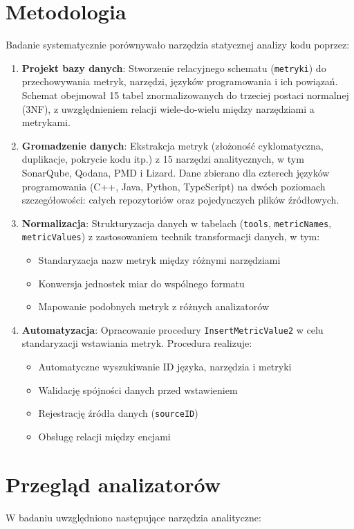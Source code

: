 \documentclass[a4paper,12pt]{article}
\begin{document}
\section{Metodologia}
Badanie systematycznie porównywało narzędzia statycznej analizy kodu poprzez:

\begin{enumerate}
\item \textbf{Projekt bazy danych}: Stworzenie relacyjnego schematu (\texttt{metryki}) do przechowywania metryk, narzędzi, języków programowania i ich powiązań. Schemat obejmował 15 tabel znormalizowanych do trzeciej postaci normalnej (3NF), z uwzględnieniem relacji wiele-do-wielu między narzędziami a metrykami.

\item \textbf{Gromadzenie danych}: Ekstrakcja metryk (złożoność cyklomatyczna, duplikacje, pokrycie kodu itp.) z 15 narzędzi analitycznych, w tym SonarQube, Qodana, PMD i Lizard. Dane zbierano dla czterech języków programowania (C++, Java, Python, TypeScript) na dwóch poziomach szczegółowości: całych repozytoriów oraz pojedynczych plików źródłowych.

\item \textbf{Normalizacja}: Strukturyzacja danych w tabelach (\texttt{tools}, \texttt{metricNames}, \texttt{metricValues}) z zastosowaniem technik transformacji danych, w tym:
\begin{itemize}
\item Standaryzacja nazw metryk między różnymi narzędziami
\item Konwersja jednostek miar do wspólnego formatu
\item Mapowanie podobnych metryk z różnych analizatorów
\end{itemize}

\item \textbf{Automatyzacja}: Opracowanie procedury \texttt{InsertMetricValue2} w celu standaryzacji wstawiania metryk. Procedura realizuje:
\begin{itemize}
\item Automatyczne wyszukiwanie ID języka, narzędzia i metryki
\item Walidację spójności danych przed wstawieniem
\item Rejestrację źródła danych (\texttt{sourceID})
\item Obsługę relacji między encjami
\end{itemize}
\end{enumerate}

\section{Przegląd analizatorów}
W badaniu uwzględniono następujące narzędzia analityczne:
\end{document}
